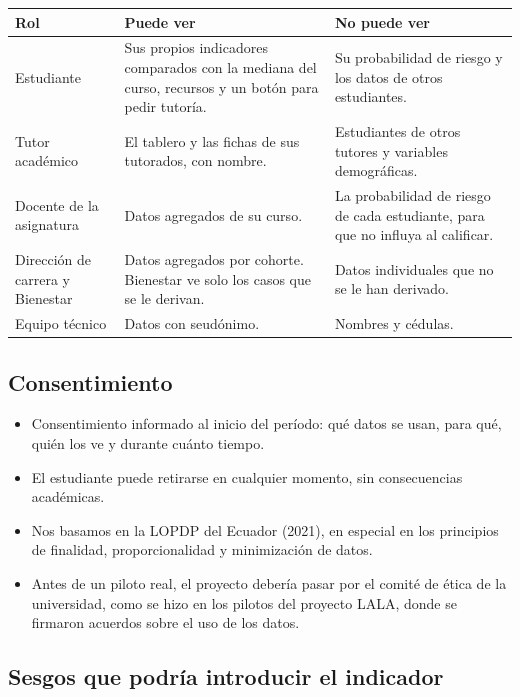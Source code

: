 \documentclass[10pt]{article}
\begin{document}
{\small
\begin{longtable}{P{5.5cm} P{10cm} P{8.7cm}}
\toprule
\textbf{Rol} & \textbf{Puede ver} & \textbf{No puede ver}\\
\midrule
Estudiante & Sus propios indicadores comparados con la mediana del curso, recursos y un botón para pedir tutoría. & Su probabilidad de riesgo y los datos de otros estudiantes.\\
Tutor académico & El tablero y las fichas de sus tutorados, con nombre. & Estudiantes de otros tutores y variables demográficas.\\
Docente de la asignatura & Datos agregados de su curso. & La probabilidad de riesgo de cada estudiante, para que no influya al calificar.\\
Dirección de carrera y Bienestar & Datos agregados por cohorte. Bienestar ve solo los casos que se le derivan. & Datos individuales que no se le han derivado.\\
Equipo técnico & Datos con seudónimo. & Nombres y cédulas.\\
\bottomrule
\end{longtable}
}

\subsection{Consentimiento}
\begin{itemize}
\item Consentimiento informado al inicio del período: qué datos se usan, para qué, quién los ve y durante cuánto tiempo.
\item El estudiante puede retirarse en cualquier momento, sin consecuencias académicas.
\item Nos basamos en la LOPDP del Ecuador (2021), en especial en los principios de finalidad, proporcionalidad y minimización de datos.
\item Antes de un piloto real, el proyecto debería pasar por el comité de ética de la universidad, como se hizo en los pilotos del proyecto LALA, donde se firmaron acuerdos sobre el uso de los datos.
\end{itemize}

\subsection{Sesgos que podría introducir el indicador}
\end{document}
